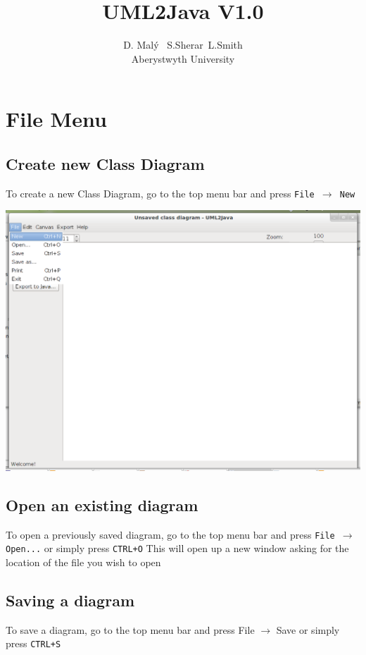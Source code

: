 \documentclass[a4paper]{article}
\title{UML2Java V1.0}
\author{D. Mal\'{y} \, S.Sherar\, L.Smith\\Aberystwyth University}
\date{}
\begin{document}
\maketitle
\tableofcontents
\section{File Menu}
\subsection{Create new Class Diagram}
To create a new Class Diagram, go to the top menu bar and press \texttt{File $\rightarrow$ New}

\begin{center} \includegraphics[scale=0.4]{./images/file-new.png} \end{center}
\subsection{Open an existing diagram}
To open a previously saved diagram, go to the top menu bar and press \texttt{File $\rightarrow$ Open...} or simply press \texttt{CTRL+O}
This will open up a new window asking for the location of the file you wish to open
\subsection{Saving a diagram}
To save a diagram, go to the top menu bar and press File $\rightarrow$ Save or simply press \texttt{CTRL+S}
\end{document}
